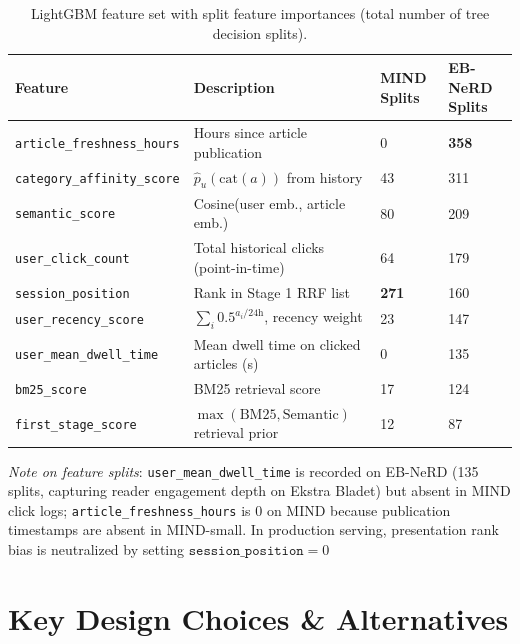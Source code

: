 \documentclass[11pt,a4paper]{article}
\begin{document}
\begin{table}[h!]
  \centering
  \caption{LightGBM feature set with split feature importances (total number of tree decision splits).}
  \label{tab:features}
  \small\setlength{\tabcolsep}{4pt}
  \begin{tabularx}{\linewidth}{l X R{2cm} R{2cm}}
    \toprule
    \textbf{Feature} & \textbf{Description} & \textbf{MIND Splits} & \textbf{EB-NeRD Splits} \\
    \midrule
    \texttt{article\_freshness\_hours} & Hours since article publication                   & 0   & \textbf{358} \\
    \texttt{category\_affinity\_score} & $\hat{p}_u(\text{cat}(a))$ from history            & 43  & 311 \\
    \texttt{semantic\_score}         & Cosine(user emb., article emb.)                     & 80  & 209 \\
    \texttt{user\_click\_count}      & Total historical clicks (point-in-time)              & 64  & 179 \\
    \texttt{session\_position}       & Rank in Stage 1 RRF list                            & \textbf{271} & 160 \\
    \texttt{user\_recency\_score}    & $\sum_i 0.5^{a_i / 24\text{h}}$, recency weight    & 23  & 147 \\
    \texttt{user\_mean\_dwell\_time} & Mean dwell time on clicked articles (s)              & 0   & 135 \\
    \texttt{bm25\_score}             & BM25 retrieval score                                & 17  & 124 \\
    \texttt{first\_stage\_score}     & $\max(\text{BM25}, \text{Semantic})$ retrieval prior & 12  & 87  \\

    \bottomrule
  \end{tabularx}
  \vspace{2pt}
  {\footnotesize \textit{Note on feature splits}: \texttt{user\_mean\_dwell\_time} is recorded on EB-NeRD (135 splits, capturing reader engagement depth on Ekstra Bladet) but absent in MIND click logs; \texttt{article\_freshness\_hours} is 0 on MIND because publication timestamps are absent in MIND-small. In production serving, presentation rank bias is neutralized by setting $\texttt{session\_position} = 0$ }
\end{table}

\section{Key Design Choices \& Alternatives}
\end{document}
